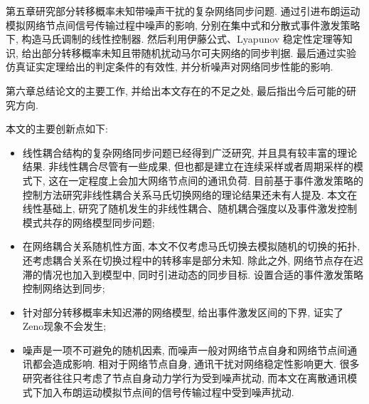 
第五章研究部分转移概率未知带噪声干扰的复杂网络同步问题. 通过引进布朗运动模拟网络节点间信号传输过程中噪声的影响, 分别在集中式和分散式事件激发策略下, 构造马氏调制的线性控制器. 然后利用伊藤公式、Lyapunov 稳定性定理等知识, 给出部分转移概率未知且带随机扰动马尔可夫网络的同步判据. 最后通过实验仿真证实定理给出的判定条件的有效性, 并分析噪声对网络同步性能的影响.


第六章总结论文的主要工作, 并给出本文存在的不足之处, 最后指出今后可能的研究方向.

本文的主要创新点如下:

\begin{itemize}\setlength{\itemsep}{0cm}
  \item 线性耦合结构的复杂网络同步问题已经得到广泛研究, 并且具有较丰富的理论结果. 非线性耦合尽管有一些成果, 但也都是建立在连续采样或者周期采样的模式下, 这在一定程度上会加大网络节点间的通讯负荷. 目前基于事件激发策略的控制方法研究非线性耦合关系马氏切换网络的理论结果还未有人提及. 本文在线性基础上, 研究了随机发生的非线性耦合、随机耦合强度以及事件激发控制模式共存的网络模型同步问题;
  \item 在网络耦合关系随机性方面, 本文不仅考虑马氏切换去模拟随机的切换的拓扑, 还考虑耦合关系在切换过程中的转移率是部分未知. 除此之外, 网络节点存在迟滞的情况也加入到模型中, 同时引进动态的同步目标. 设置合适的事件激发策略控制网络达到同步;
  \item 针对部分转移概率未知迟滞的网络模型, 给出事件激发区间的下界, 证实了Zeno现象不会发生;
  \item 噪声是一项不可避免的随机因素, 而噪声一般对网络节点自身和网络节点间通讯都会造成影响. 相对于网络节点自身, 通讯干扰对网络稳定性影响更大. 很多研究者往往只考虑了节点自身动力学行为受到噪声扰动, 而本文在离散通讯模式下加入布朗运动模拟节点间的信号传输过程中受到噪声扰动.
\end{itemize}


